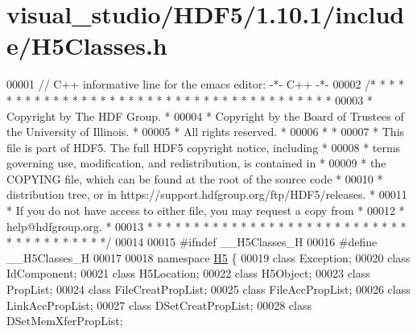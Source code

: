 \hypertarget{visual__studio_2_h_d_f5_21_810_81_2include_2_h5_classes_8h_source}{}\section{visual\+\_\+studio/\+H\+D\+F5/1.10.1/include/\+H5\+Classes.h}
\label{visual__studio_2_h_d_f5_21_810_81_2include_2_h5_classes_8h_source}

\begin{DoxyCode}
00001 \textcolor{comment}{// C++ informative line for the emacs editor: -*- C++ -*-}
00002 \textcolor{comment}{/* * * * * * * * * * * * * * * * * * * * * * * * * * * * * * * * * * * * * * *}
00003 \textcolor{comment}{ * Copyright by The HDF Group.                                               *}
00004 \textcolor{comment}{ * Copyright by the Board of Trustees of the University of Illinois.         *}
00005 \textcolor{comment}{ * All rights reserved.                                                      *}
00006 \textcolor{comment}{ *                                                                           *}
00007 \textcolor{comment}{ * This file is part of HDF5.  The full HDF5 copyright notice, including     *}
00008 \textcolor{comment}{ * terms governing use, modification, and redistribution, is contained in    *}
00009 \textcolor{comment}{ * the COPYING file, which can be found at the root of the source code       *}
00010 \textcolor{comment}{ * distribution tree, or in https://support.hdfgroup.org/ftp/HDF5/releases.  *}
00011 \textcolor{comment}{ * If you do not have access to either file, you may request a copy from     *}
00012 \textcolor{comment}{ * help@hdfgroup.org.                                                        *}
00013 \textcolor{comment}{ * * * * * * * * * * * * * * * * * * * * * * * * * * * * * * * * * * * * * * */}
00014 
00015 \textcolor{preprocessor}{#ifndef \_\_H5Classes\_H}
00016 \textcolor{preprocessor}{#define \_\_H5Classes\_H}
00017 
00018 \textcolor{keyword}{namespace }\hyperlink{namespace_h5}{H5} \{
00019         \textcolor{keyword}{class }Exception;
00020         \textcolor{keyword}{class }IdComponent;
00021         \textcolor{keyword}{class }H5Location;
00022         \textcolor{keyword}{class }H5Object;
00023         \textcolor{keyword}{class }PropList;
00024         \textcolor{keyword}{class }FileCreatPropList;
00025         \textcolor{keyword}{class }FileAccPropList;
00026         \textcolor{keyword}{class }LinkAccPropList;
00027         \textcolor{keyword}{class }DSetCreatPropList;
00028         \textcolor{keyword}{class }DSetMemXferPropList;

\end{DoxyCode}
